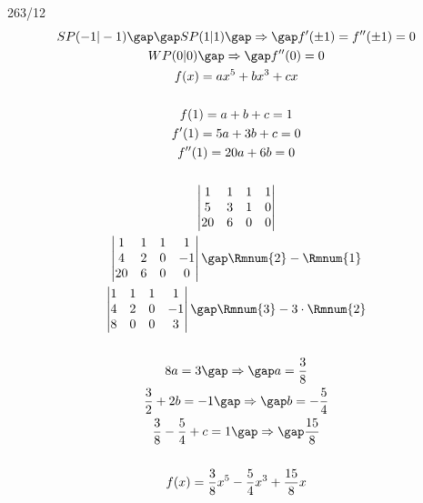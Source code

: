 \begin{exercise}{263/12}
  \begin{gather*}
    SP(-1|-1) \gap\gap SP(1|1) \gap\Rightarrow\gap f'(\pm1) = f''(\pm1) = 0 \\
    WP(0|0) \gap\Rightarrow\gap f''(0) = 0 \\
    f(x) = ax^5 + bx^3 + cx \\\\
    f(1) = a + b + c = 1 \\
    f'(1) = 5a + 3b + c = 0 \\
    f''(1) = 20a + 6b = 0 \\\\
    \begin{vmatrix}
      1 & 1 & 1 & 1 \\
      5 & 3 & 1 & 0 \\
      20 & 6 & 0 & 0
    \end{vmatrix} \\
    \begin{vmatrix}
      1 & 1 & 1 & 1 \\
      4 & 2 & 0 & -1 \\
      20 & 6 & 0 & 0
    \end{vmatrix} \gap \Rmnum{2} - \Rmnum{1} \\
    \begin{vmatrix}
      1 & 1 & 1 & 1 \\
      4 & 2 & 0 & -1 \\
      8 & 0 & 0 & 3
    \end{vmatrix} \gap \Rmnum{3} - 3 \cdot \Rmnum{2} \\\\
    8a = 3 \gap\Rightarrow\gap a = \frac{3}{8} \\
    \frac{3}{2} + 2b = -1 \gap\Rightarrow\gap b = -\frac{5}{4} \\
    \frac{3}{8} - \frac{5}{4} + c = 1 \gap\Rightarrow\gap \frac{15}{8} \\\\
    f(x) = \frac{3}{8}x^5 - \frac{5}{4}x^3 + \frac{15}{8}x
  \end{gather*}
\end{exercise}

